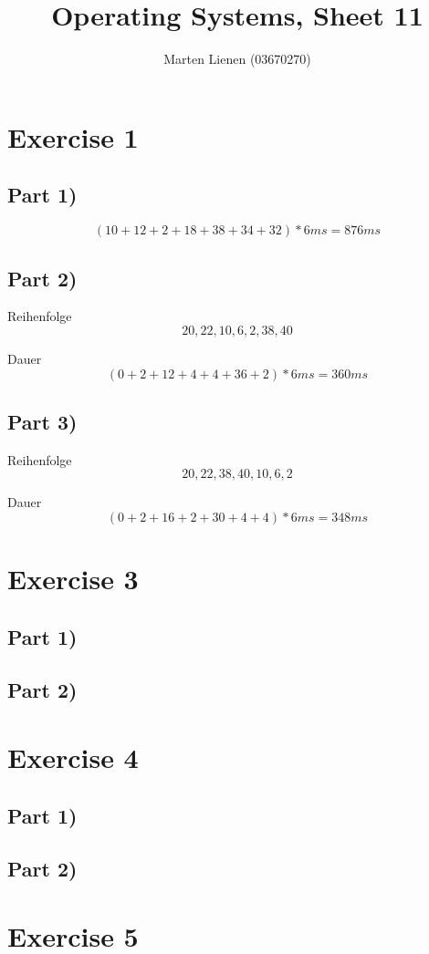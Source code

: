 \documentclass[10pt,a4paper]{article}
\title{Operating Systems, Sheet 11}
\author{Marten Lienen (03670270)}
\begin{document}
\maketitle

\section*{Exercise 1}

\subsection*{Part 1)}

\begin{equation*}
  (10 + 12 + 2 + 18 + 38 + 34 + 32) * 6ms = 876ms
\end{equation*}

\subsection*{Part 2)}

Reihenfolge
\begin{equation*}
  20, 22, 10, 6, 2, 38, 40
\end{equation*}

Dauer
\begin{equation*}
  (0 + 2 + 12 + 4 + 4 + 36 + 2) * 6ms = 360ms
\end{equation*}

\subsection*{Part 3)}

Reihenfolge
\begin{equation*}
  20, 22, 38, 40, 10, 6, 2
\end{equation*}

Dauer
\begin{equation*}
  (0 + 2 + 16 + 2 + 30 + 4 + 4) * 6ms = 348ms
\end{equation*}

\section*{Exercise 3}

\subsection*{Part 1)}

\subsection*{Part 2)}

\section*{Exercise 4}

\subsection*{Part 1)}

\subsection*{Part 2)}

\section*{Exercise 5}
\end{document}
